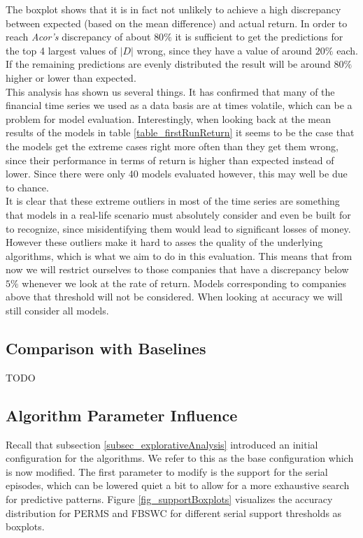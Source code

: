 The boxplot shows that it is in fact not unlikely to achieve a high discrepancy between expected (based on the mean difference) and actual return. In order to reach \textit{Acor's} discrepancy of about $80\%$ it is sufficient to get the predictions for the top 4 largest values of $|D|$ wrong, since they have a value of around $20\%$ each. If the remaining predictions are evenly distributed the result will be around $80\%$ higher or lower than expected. \\
This analysis has shown us several things. It has confirmed that many of the financial time series we used as a data basis are at times volatile, which can be a problem for model evaluation. Interestingly, when looking back at the mean results of the models in table \ref{table_firstRunReturn} it seems to be the case that the models get the extreme cases right more often than they get them wrong, since their performance in terms of return is higher than expected instead of lower. Since there were only 40 models evaluated however, this may well be due to chance. \\
It is clear that these extreme outliers in most of the time series are something that models in a real-life scenario must absolutely consider and even be built for to recognize, since misidentifying them would lead to significant losses of money. However these outliers make it hard to asses the quality of the underlying algorithms, which is what we aim to do in this evaluation. This means that from now we will restrict ourselves to those companies that have a discrepancy below $5\%$ whenever we look at the rate of return. Models corresponding to companies above that threshold will not be considered. When looking at accuracy we will still consider all models.

\subsection{Comparison with Baselines}
TODO

\subsection{Algorithm Parameter Influence}
Recall that subsection \ref{subsec_explorativeAnalysis} introduced an initial configuration for the algorithms. We refer to this as the base configuration which is now modified. The first parameter to modify is the support for the serial episodes, which can be lowered quiet a bit to allow for a more exhaustive search for predictive patterns. Figure \ref{fig_supportBoxplots} visualizes the accuracy distribution for PERMS and FBSWC for different serial support thresholds as boxplots.

